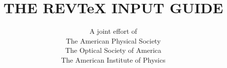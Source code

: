 %
%
%
%
%
\def\REVTeX{REV\TeX}

\flushbottom
\def\thepage{\roman{page}}
\title{\vspace*{1.5in}THE \REVTeX{} INPUT GUIDE}
\author{A joint effort of\\The American Physical Society\\The Optical
Society of America\\The American Institute of Physics}

